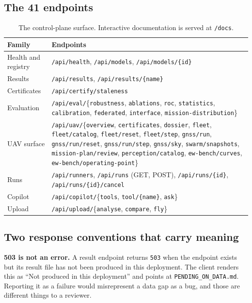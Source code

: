 \documentclass[11pt,a4paper]{article}
\newcommand{\code}[1]{\texttt{#1}}
\begin{document}
\subsection{The 41 endpoints}
\begin{table}[H]
\centering\footnotesize
\begin{tabularx}{\linewidth}{@{}p{3.0cm}X@{}}
\toprule
\textbf{Family} & \textbf{Endpoints} \\
\midrule
Health and registry & \code{/api/health}, \code{/api/models}, \code{/api/models/\{id\}} \\
Results & \code{/api/results}, \code{/api/results/\{name\}} \\
Certificates & \code{/api/certify/staleness} \\
Evaluation & \code{/api/eval/}\{\code{robustness}, \code{ablations}, \code{roc}, \code{statistics}, \code{calibration}, \code{federated}, \code{interface}, \code{mission-distribution}\} \\
UAV surface & \code{/api/uav/}\{\code{overview}, \code{certificates}, \code{dossier}, \code{fleet}, \code{fleet/catalog}, \code{fleet/reset}, \code{fleet/step}, \code{gnss/run}, \code{gnss/run/reset}, \code{gnss/run/step}, \code{gnss/sky}, \code{swarm/snapshots}, \code{mission-plan/review}, \code{perception/catalog}, \code{ew-bench/curves}, \code{ew-bench/operating-point}\} \\
Runs & \code{/api/runners}, \code{/api/runs} (GET, POST), \code{/api/runs/\{id\}}, \code{/api/runs/\{id\}/cancel} \\
Copilot & \code{/api/copilot/}\{\code{tools}, \code{tool/\{name\}}, \code{ask}\} \\
Upload & \code{/api/upload/}\{\code{analyse}, \code{compare}, \code{fly}\} \\
\bottomrule
\end{tabularx}
\caption{The control-plane surface. Interactive documentation is served at
\code{/docs}.}
\end{table}

\subsection{Two response conventions that carry meaning}
\textbf{503 is not an error.} A result endpoint returns \code{503} when the
endpoint exists but its result file has not been produced in this deployment.
The client renders this as ``Not produced in this deployment'' and points at
\code{PENDING\_ON\_DATA.md}. Reporting it as a failure would misrepresent a
data gap as a bug, and those are different things to a reviewer.
\end{document}
